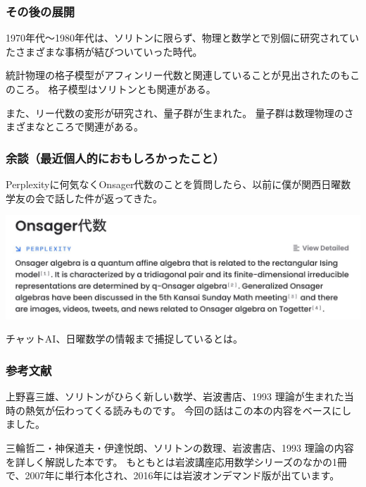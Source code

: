 \documentclass{beamer}
\begin{document}
\begin{frame}
    \frametitle{その後の展開}

    1970年代〜1980年代は、ソリトンに限らず、物理と数学とで別個に研究されていたさまざまな事柄が結びついていった時代。

    \bigskip
    統計物理の格子模型がアフィンリー代数と関連していることが見出されたのもこのころ。
    格子模型はソリトンとも関連がある。

    \bigskip
    また、リー代数の変形が研究され、量子群が生まれた。
    量子群は数理物理のさまざまなところで関連がある。
\end{frame}

\begin{frame}
    \frametitle{余談（最近個人的におもしろかったこと）}

    Perplexityに何気なくOnsager代数のことを質問したら、以前に僕が関西日曜数学友の会で話した件が返ってきた。

    \begin{center}
        \includegraphics[scale=0.2]{Perplexity.jpeg}
    \end{center}

    チャットAI、日曜数学の情報まで捕捉しているとは。
\end{frame}

\begin{frame}
    \frametitle{参考文献}

    \begin{block}{上野喜三雄、ソリトンがひらく新しい数学、岩波書店、1993}
        理論が生まれた当時の熱気が伝わってくる読みものです。
        今回の話はこの本の内容をベースにしました。
    \end{block}

    \begin{block}{三輪哲二・神保道夫・伊達悦朗、ソリトンの数理、岩波書店、1993}
        理論の内容を詳しく解説した本です。
        もともとは岩波講座応用数学シリーズのなかの1冊で、2007年に単行本化され、2016年には岩波オンデマンド版が出ています。
    \end{block}
\end{frame}
\end{document}
